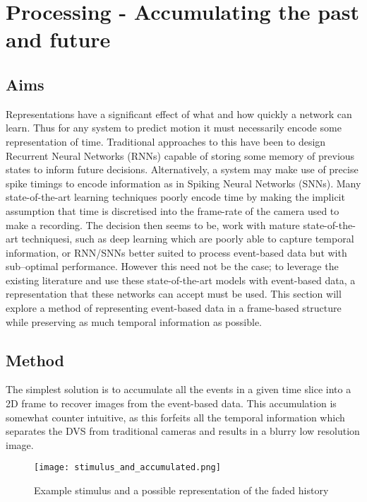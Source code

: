 \chapter{Processing - Accumulating the past and future}
\label{ch:preprocess}

\section{Aims}
Representations have a significant effect of what and how quickly a network can learn\cite{akolkar2015can}. 
Thus for any system to predict motion it must necessarily encode some representation of time. 
Traditional approaches to this have been to design Recurrent Neural Networks (RNNs) capable of storing some memory of previous states to inform future decisions.  
Alternatively, a system may make use of precise spike timings to encode information as in Spiking Neural Networks (SNNs). 
Many state-of-the-art learning techniques poorly encode time by making the implicit assumption that time is discretised into the frame-rate of the camera used to make a recording.
The decision then seems to be, work with mature state-of-the-art techniquesi, such as deep learning which are poorly able to capture temporal information, or RNN/SNNs better suited to process event-based data but with sub--optimal performance.   
However this need not be the case; to leverage the existing literature and use these state-of-the-art models with event-based data, a representation that these networks can accept must be used. 
This section will explore a method of representing event-based data in a frame-based structure while preserving as much temporal information as possible. 


\section{Method}
The simplest solution is to accumulate all the events in a given time slice into a 2D frame to recover images from the event-based data.
This accumulation is somewhat counter intuitive, as this forfeits all the temporal information which separates the DVS from traditional cameras and results in a blurry low resolution image. 

\begin{wrapfigure}{r}{0.6\textwidth}
    \centering
    \texttt{[image: stimulus\_and\_accumulated.png]}
    \caption{Example stimulus and a possible representation of the faded history}
    \label{fig:fadedhistory}
\end{wrapfigure}

